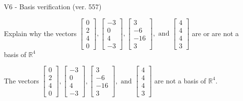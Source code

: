 \begin{exercise}
  \begin{exerciseTitle}V6 - Basis verification (ver. 557)\end{exerciseTitle}
  \begin{exerciseStatement}
    Explain why the vectors \(\left[\begin{array}{r}
0 \\
2 \\
4 \\
0
\end{array}\right] , \left[\begin{array}{r}
-3 \\
0 \\
4 \\
-3
\end{array}\right] , \left[\begin{array}{r}
3 \\
-6 \\
-16 \\
3
\end{array}\right] , \text{ and } \left[\begin{array}{r}
4 \\
4 \\
4 \\
3
\end{array}\right]\) are or are not a basis of \(\mathbb{R}^4\)	


  \end{exerciseStatement}
  \begin{exerciseAnswer}
   The vectors \(\left[\begin{array}{r}
0 \\
2 \\
4 \\
0
\end{array}\right] , \left[\begin{array}{r}
-3 \\
0 \\
4 \\
-3
\end{array}\right] , \left[\begin{array}{r}
3 \\
-6 \\
-16 \\
3
\end{array}\right] , \text{ and } \left[\begin{array}{r}
4 \\
4 \\
4 \\
3
\end{array}\right]\) 
  	 are not  a basis of \(\mathbb{R}^4\).
  


  \end{exerciseAnswer}
\end{exercise}